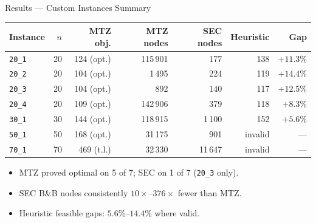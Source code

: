 \documentclass{beamer}
\newcommand{\hrow}{\rowcolor{hlblue}}
\begin{document}
\begin{frame}{Results --- Custom Instances Summary}

\renewcommand{\arraystretch}{1.18}
\small
\begin{center}
\begin{tabular}{lrrrrrr}
\toprule
\textbf{Instance} & \textbf{$n$} & \textbf{MTZ obj.} & \textbf{MTZ nodes} & \textbf{SEC nodes} & \textbf{Heuristic} & \textbf{Gap} \\
\midrule
\hrow \texttt{20\_1} & 20 & 124 (opt.) & 115\,901 & 177 & 138 & $+11.3\%$ \\
\texttt{20\_2} & 20 & 104 (opt.) & 1\,495   & 224 & 119 & $+14.4\%$ \\
\hrow \texttt{20\_3} & 20 & 104 (opt.) & 892      & 140 & 117 & $+12.5\%$ \\
\texttt{20\_4} & 20 & 109 (opt.) & 142\,906 & 379 & 118 & $+8.3\%$ \\
\hrow \texttt{30\_1} & 30 & 144 (opt.) & 118\,915 & 1\,100 & 152 & $+5.6\%$ \\
\texttt{50\_1} & 50 & 168 (opt.) & 31\,175  & 901 & invalid & --- \\
\hrow \texttt{70\_1} & 70 & 469 (t.l.) & 32\,330  & 11\,647 & invalid & --- \\
\bottomrule
\end{tabular}
\end{center}

\vspace{4pt}
\small
\begin{itemize}\setlength\itemsep{2pt}
  \item MTZ proved optimal on 5 of 7; SEC on 1 of 7 (\texttt{20\_3} only).
  \item SEC B\&B nodes consistently $10\times$--$376\times$ fewer than MTZ.
  \item Heuristic feasible gaps: $5.6\%$--$14.4\%$ where valid.
\end{itemize}

\end{frame}
\end{document}
